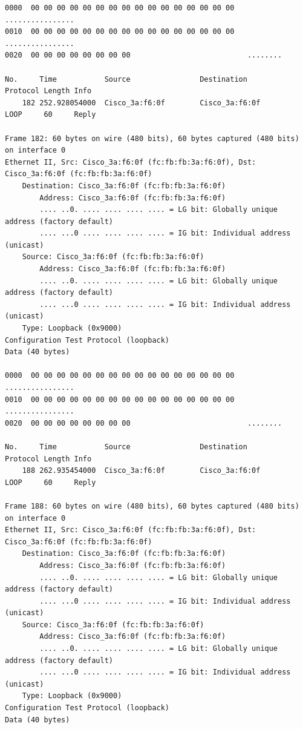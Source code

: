 \documentclass[a4paper,11pt]{article}
\begin{document}
\begin{lstlisting}
0000  00 00 00 00 00 00 00 00 00 00 00 00 00 00 00 00   ................
0010  00 00 00 00 00 00 00 00 00 00 00 00 00 00 00 00   ................
0020  00 00 00 00 00 00 00 00                           ........

No.     Time           Source                Destination           Protocol Length Info
    182 252.928054000  Cisco_3a:f6:0f        Cisco_3a:f6:0f        LOOP     60     Reply

Frame 182: 60 bytes on wire (480 bits), 60 bytes captured (480 bits) on interface 0
Ethernet II, Src: Cisco_3a:f6:0f (fc:fb:fb:3a:f6:0f), Dst: Cisco_3a:f6:0f (fc:fb:fb:3a:f6:0f)
    Destination: Cisco_3a:f6:0f (fc:fb:fb:3a:f6:0f)
        Address: Cisco_3a:f6:0f (fc:fb:fb:3a:f6:0f)
        .... ..0. .... .... .... .... = LG bit: Globally unique address (factory default)
        .... ...0 .... .... .... .... = IG bit: Individual address (unicast)
    Source: Cisco_3a:f6:0f (fc:fb:fb:3a:f6:0f)
        Address: Cisco_3a:f6:0f (fc:fb:fb:3a:f6:0f)
        .... ..0. .... .... .... .... = LG bit: Globally unique address (factory default)
        .... ...0 .... .... .... .... = IG bit: Individual address (unicast)
    Type: Loopback (0x9000)
Configuration Test Protocol (loopback)
Data (40 bytes)

0000  00 00 00 00 00 00 00 00 00 00 00 00 00 00 00 00   ................
0010  00 00 00 00 00 00 00 00 00 00 00 00 00 00 00 00   ................
0020  00 00 00 00 00 00 00 00                           ........

No.     Time           Source                Destination           Protocol Length Info
    188 262.935454000  Cisco_3a:f6:0f        Cisco_3a:f6:0f        LOOP     60     Reply

Frame 188: 60 bytes on wire (480 bits), 60 bytes captured (480 bits) on interface 0
Ethernet II, Src: Cisco_3a:f6:0f (fc:fb:fb:3a:f6:0f), Dst: Cisco_3a:f6:0f (fc:fb:fb:3a:f6:0f)
    Destination: Cisco_3a:f6:0f (fc:fb:fb:3a:f6:0f)
        Address: Cisco_3a:f6:0f (fc:fb:fb:3a:f6:0f)
        .... ..0. .... .... .... .... = LG bit: Globally unique address (factory default)
        .... ...0 .... .... .... .... = IG bit: Individual address (unicast)
    Source: Cisco_3a:f6:0f (fc:fb:fb:3a:f6:0f)
        Address: Cisco_3a:f6:0f (fc:fb:fb:3a:f6:0f)
        .... ..0. .... .... .... .... = LG bit: Globally unique address (factory default)
        .... ...0 .... .... .... .... = IG bit: Individual address (unicast)
    Type: Loopback (0x9000)
Configuration Test Protocol (loopback)
Data (40 bytes)


\end{lstlisting}
\end{document}
